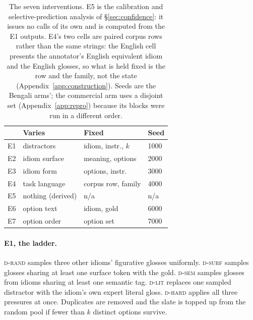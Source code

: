 \documentclass[11pt]{article}
\newcommand{\neu}[1]{\cellcolor{fGrey!55}#1}
\newcommand{\Drand}{\textsc{d-rand}}
\newcommand{\Dsurf}{\textsc{d-surf}}
\newcommand{\Dsem}{\textsc{d-sem}}
\newcommand{\Dlit}{\textsc{d-lit}}
\newcommand{\Dhard}{\textsc{d-hard}}
\begin{document}
\begin{table}[h]
\centering\small
\setlength{\tabcolsep}{3pt}
\begin{tabular}{llll}
\toprule
& \textbf{Varies} & \textbf{Fixed} & \textbf{Seed} \\
\midrule
\neu{E1} & \neu{distractors} & \neu{idiom, instr., $k$} & \neu{1000} \\
E2 & idiom surface & meaning, options & 2000 \\
E3 & idiom form & options, instr. & 3000 \\
E4 & task language & corpus row, family & 4000 \\
\neu{E5} & \neu{nothing (derived)} & \neu{n/a} & \neu{n/a} \\
E6 & option text & idiom, gold & 6000 \\
E7 & option order & option set & 7000 \\
\bottomrule
\end{tabular}
\caption{The seven interventions. E5 is the calibration and selective-prediction
analysis of \S\ref{sec:confidence}: it issues no calls of its own and is computed
from the E1 outputs. E4's two cells are paired corpus rows rather than the same
strings: the English cell presents the annotator's English equivalent idiom and
the English glosses, so what is held fixed is the row and the family, not the
state (Appendix~\ref{app:construction}). Seeds are the Bengali arms'; the
commercial arm uses a disjoint set (Appendix~\ref{app:repro}) because its blocks
were run in a different order.}
\label{tab:expgrid}
\end{table}

\paragraph{E1, the ladder.} \Drand{} samples three other idioms' figurative
glosses uniformly. \Dsurf{} samples glosses sharing at least one surface token
with the gold. \Dsem{} samples glosses from idioms sharing at least one semantic
tag. \Dlit{} replaces one sampled distractor with the idiom's own expert literal
gloss. \Dhard{} applies all three pressures at once. Duplicates are removed and
the slate is topped up from the random pool if fewer than $k$ distinct options
survive.
\end{document}
